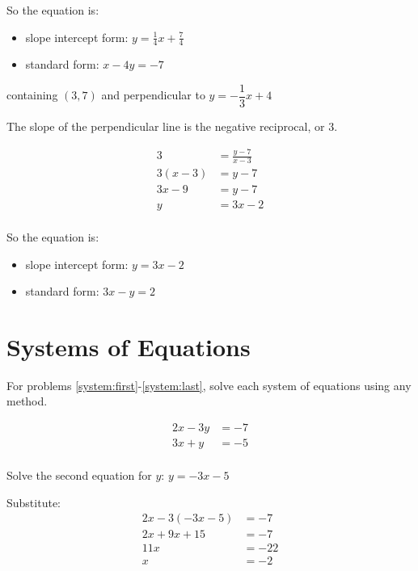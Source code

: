 \documentclass[fleqn,addpoints]{exam}
\begin{document}
\begin{questions}
\begin{solution}[6 cm]
So the equation is: 
\begin{itemize}
  \item slope intercept form: $y = \frac{1}{4} x + \frac{7}{4}$
  \item standard form: $x-4y = -7$
\end{itemize}

\end{solution}

\question[10] containing $(3, 7)$ and perpendicular to $y = -\dfrac{1}{3} x + 4$
\label{equation:last}
\begin{solution}[6 cm]
The slope of the perpendicular line is the negative reciprocal, or $3$.

\begin{align*}
  3 &= \frac{y-7}{x-3} \\
  3(x-3) &= y-7 \\
  3x-9 &= y-7 \\
  y &= 3x-2 \\
\end{align*}

So the equation is: 
\begin{itemize}
  \item slope intercept form: $y = 3x - 2$
  \item standard form: $3x - y = 2$
\end{itemize}

\end{solution}

\ifprintanswers
\else
\pagebreak
\fi

\section{Systems of Equations}
For problems \ref{system:first}-\ref{system:last}, solve each system of equations using any method.

\question[10] 
\label{system:first}
\begin{align*}
  2x - 3y &= -7 \\
  3x + y &= -5 \\
\end{align*}

\begin{solution}[6 cm]
Solve the second equation for $y$: $y = -3x - 5$

Substitute:
\begin{align*}
  2x - 3(-3x - 5) &= -7 \\
  2x + 9x + 15 &= -7 \\
  11x &= -22 \\
  x &= -2
\end{align*}


\end{solution}
\end{questions}
\end{document}
